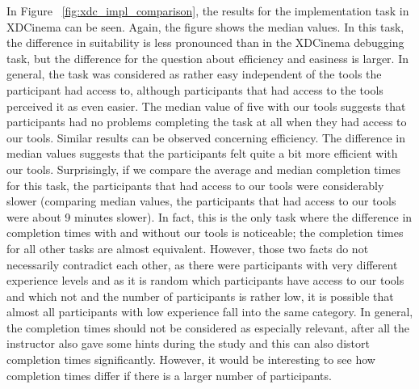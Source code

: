 In Figure ~\ref{fig:xdc_impl_comparison}, the results for the implementation task in XDCinema can be seen. Again, the figure shows the median values. In this task, the difference in suitability is less pronounced than in the XDCinema debugging task, but the difference for the question about efficiency and easiness is larger. In general, the task was considered as rather easy independent of the tools the participant had access to, although participants that had access to the tools perceived it as even easier. The median value of five with our tools suggests that participants had no problems completing the task at all when they had access to our tools. Similar results can be observed concerning efficiency. The difference in median values suggests that the participants felt quite a bit more efficient with our tools. Surprisingly, if we compare the average and median completion times for this task, the participants that had access to our tools were considerably slower (comparing median values, the participants that had access to our tools were about 9 minutes slower). In fact, this is the only task where the difference in completion times with and without our tools is noticeable; the completion times for all other tasks are almost equivalent. However, those two facts do not necessarily contradict each other, as there were participants with very different experience levels and as it is random which participants have access to our tools and which not and the number of participants is rather low, it is possible that almost all participants with low experience fall into the same category. In general, the completion times should not be considered as especially relevant, after all the instructor also gave some hints during the study and this can also distort completion times significantly. However, it would be interesting to see how completion times differ if there is a larger number of participants. 


